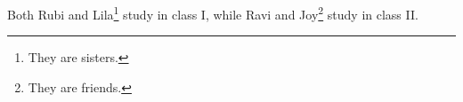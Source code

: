 \documentclass{article}
\begin{document}
Both Rubi and Lila\footnote{They are sisters.} study in class I, while Ravi and Joy\footnote{They are friends.\label{fn:friends}} study in class II.
\end{document}
